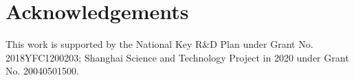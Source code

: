 \section{Acknowledgements}
\label{sec:Acknowledgement}

This work is supported by the National 
Key R\&D Plan under Grant No. 2018YFC1200203; 
Shanghai Science and Technology Project in 
2020 under Grant No. 20040501500.